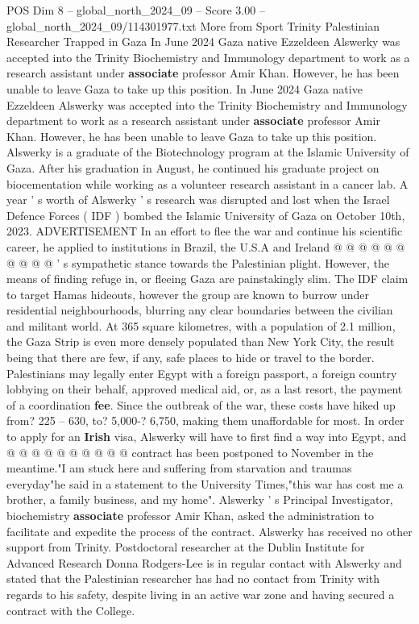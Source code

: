 \begin{textsample}{POS Dim 8 – global\_north\_2024\_09 – Score 3.00 – global\_north\_2024\_09/114301977.txt}  \label{ex:f8_pos_294}
More from Sport Trinity Palestinian Researcher Trapped in Gaza In June 2024 Gaza native Ezzeldeen Alswerky was accepted into the Trinity Biochemistry and Immunology department to work as a research assistant under \textbf{associate} professor Amir Khan.
However, he has been unable to leave Gaza to take up this position.
In June 2024 Gaza native Ezzeldeen Alswerky was accepted into the Trinity Biochemistry and Immunology department to work as a research assistant under \textbf{associate} professor Amir Khan.
However, he has been unable to leave Gaza to take up this position.
Alswerky is a graduate of the Biotechnology program at the Islamic University of Gaza.
After his graduation in August, he continued his graduate project on biocementation while working as a volunteer research assistant in a cancer lab.
A year ' s worth of Alswerky ' s research was disrupted and lost when the Israel Defence Forces ( IDF ) bombed the Islamic University of Gaza on October 10th, 2023.
ADVERTISEMENT In an effort to flee the war and continue his scientific career, he applied to institutions in Brazil, the U.S.A and Ireland @ @ @ @ @ @ @ @ @ @ ' s sympathetic stance towards the Palestinian plight.
However, the means of finding refuge in, or fleeing Gaza are painstakingly slim.
The IDF claim to target Hamas hideouts, however the group are known to burrow under residential neighbourhoods, blurring any clear boundaries between the civilian and militant world.
At 365 square kilometres, with a population of 2.1 million, the Gaza Strip is even more densely populated than New York City, the result being that there are few, if any, safe places to hide or travel to the border.
Palestinians may legally enter Egypt with a foreign passport, a foreign country lobbying on their behalf, approved medical aid, or, as a last resort, the payment of a coordination \textbf{fee}.
Since the outbreak of the war, these costs have hiked up from? 225 -- 630, to? 5,000-? 6,750, making them unaffordable for most.
In order to apply for an \textbf{Irish} visa, Alswerky will have to first find a way into Egypt, and @ @ @ @ @ @ @ @ @ @ contract has been postponed to November in the meantime."I am stuck here and suffering from starvation and traumas everyday"he said in a statement to the University Times,"this war has cost me a brother, a family business, and my home".
Alswerky ' s Principal Investigator, biochemistry \textbf{associate} professor Amir Khan, asked the administration to facilitate and expedite the process of the contract.
Alswerky has received no other support from Trinity.
Postdoctoral researcher at the Dublin Institute for Advanced Research Donna Rodgers-Lee is in regular contact with Alswerky and stated that the Palestinian researcher has had no contact from Trinity with regards to his safety, despite living in an active war zone and having secured a contract with the College.

\end{textsample}
